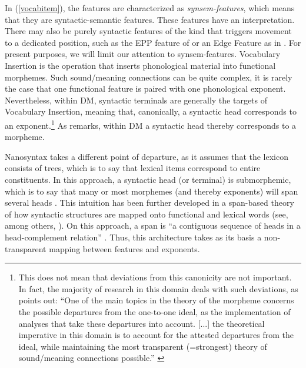 \documentclass[output=paper,colorlinks,citecolor=brown,footheight=42pt]{langscibook}
\begin{document}
\noindent
In (\ref{vocabitem}), the features are characterized as {\itshape synsem-features}, which means that they are syntactic-semantic features. These features have an interpretation. There may also be purely syntactic features of the kind that triggers movement to a dedicated position, such as the EPP feature of \citet{chomsky1982} or an Edge Feature as in \citet{chomsky2008}. For present purposes, we will limit our attention to synsem-features. Vocabulary Insertion is the operation that inserts phonological material into functional morphemes. Such sound/meaning connections can be quite complex, it is rarely the case that one functional feature is paired with one phonological exponent. Nevertheless, within DM, syntactic terminals are generally the targets of Vocabulary Insertion, meaning that, canonically, a syntactic head corresponds to an exponent.\footnote{This does not mean that deviations from this canonicity are not important. In fact, the majority of research in this domain deals with such deviations, as \citet[25]{embick2015} points out: “One of the main topics in the theory of the morpheme concerns the possible departures from the one-to-one ideal, as the implementation of analyses that take these departures into account. [...] the theoretical imperative in this domain is to account for the attested departures from the ideal, while maintaining the most transparent (=strongest) theory of sound\slash meaning connections possible.” \label{fn:lohndal:4}} As \citet[205]{svenonius2016} remarks, within DM a syntactic head thereby corresponds to a morpheme.

Nanosyntax takes a different point of departure, as it assumes that the lexicon consists of trees, which is to say that lexical items correspond to entire constituents. In this approach, a syntactic head (or terminal) is submorphemic, which is to say that many or most morphemes (and thereby exponents) will span several heads \citep{starke2009}. This intuition has been further developed in a span-based theory of how syntactic structures are mapped onto functional and lexical words (see, among others, \citealt{svenonius2016}). On this approach, a span is “a contiguous sequence of heads in a head-complement relation” \citep[205]{svenonius2016}. Thus, this architecture takes as its basis a non-transparent mapping between features and exponents.
\end{document}
